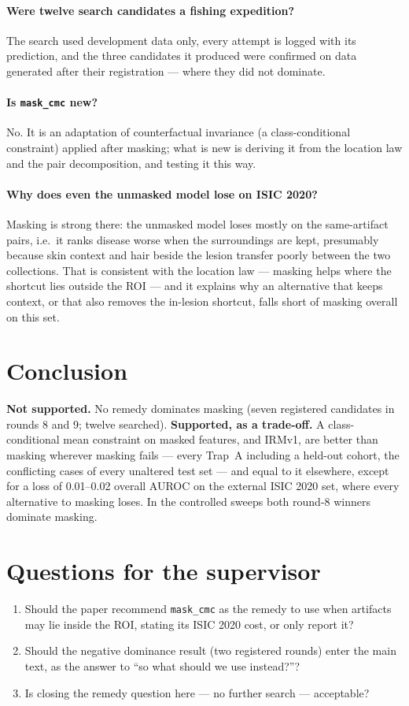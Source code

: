 \paragraph{Were twelve search candidates a fishing expedition?} The search used development data only, every attempt is
logged with its prediction, and the three candidates it produced were confirmed on data generated after their
registration --- where they did not dominate.
\paragraph{Is \texttt{mask\_cmc} new?} No. It is an adaptation of counterfactual invariance (a class-conditional
constraint) applied after masking; what is new is deriving it from the location law and the pair decomposition, and
testing it this way.
\paragraph{Why does even the unmasked model lose on ISIC 2020?} Masking is strong there: the unmasked model loses mostly
on the same-artifact pairs, i.e.\ it ranks disease worse when the surroundings are kept, presumably because skin context
and hair beside the lesion transfer poorly between the two collections. That is consistent with the location law ---
masking helps where the shortcut lies outside the ROI --- and it explains why an alternative that keeps context, or that
also removes the in-lesion shortcut, falls short of masking overall on this set.

\section{Conclusion}
\textbf{Not supported.} No remedy dominates masking (seven registered candidates in rounds 8 and 9; twelve searched).
\textbf{Supported, as a trade-off.} A class-conditional mean constraint on masked features, and IRMv1, are better than
masking wherever masking fails --- every Trap~A including a held-out cohort, the conflicting cases of every unaltered test
set --- and equal to it elsewhere, except for a loss of 0.01--0.02 overall AUROC on the external ISIC 2020 set, where
every alternative to masking loses. In the controlled sweeps both round-8 winners dominate masking.

\section{Questions for the supervisor}
\begin{enumerate}\itemsep1pt
\item Should the paper recommend \texttt{mask\_cmc} as the remedy to use when artifacts may lie inside the ROI,
stating its ISIC 2020 cost, or only report it?
\item Should the negative dominance result (two registered rounds) enter the main text, as the answer to ``so what should
we use instead?''?
\item Is closing the remedy question here --- no further search --- acceptable?
\end{enumerate}




